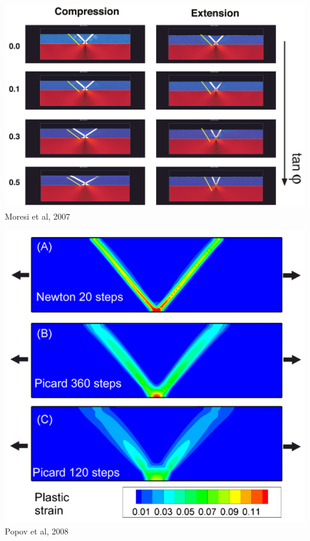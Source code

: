 \begin{center}
\begin{minipage}{0.45\textwidth}
\centering
\includegraphics[height=0.8\textwidth]{images/benchmark_brick/moml07}\\
{\captionfont Moresi et al, 2007 \cite{moml07}}
\end{minipage}\hfill
\begin{minipage}{0.45\textwidth}
\centering
\includegraphics[height=0.8\textwidth]{images/benchmark_brick/poso08}\\
{\captionfont Popov et al, 2008 \cite{poso08}}
\end{minipage}
\end{center}

